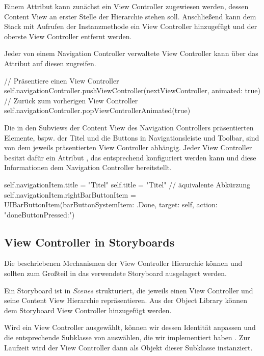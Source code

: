 \documentclass[parskip=half, final]{scrreprt}
\begin{document}
Einem Attribut  kann zunächst ein View Controller zugewiesen werden, dessen Content View an erster Stelle der Hierarchie stehen soll. Anschließend kann dem Stack mit Aufrufen der Instanzmethode  ein View Controller hinzugefügt und  der oberste View Controller entfernt werden.

Jeder von einem Navigation Controller verwaltete View Controller kann über das Attribut  auf diesen zugreifen.

\begin{swiftcode}
// Präsentiere einen View Controller
self.navigationController.pushViewController(nextViewController, animated: true)
// Zurück zum vorherigen View Controller
self.navigationController.popViewControllerAnimated(true)
\end{swiftcode}

Die in den Subviews der Content View des Navigation Controllers präsentierten Elemente, bspw. der Titel und die Buttons in Navigationsleiste und Toolbar, sind von dem jeweils präsentierten View Controller abhängig. Jeder View Controller besitzt dafür ein Attribut , das entsprechend konfiguriert werden kann und diese Informationen dem Navigation Controller bereitstellt.

\begin{swiftcode}
self.navigationItem.title = "Titel"
self.title = "Titel" // äquivalente Abkürzung
self.navigationItem.rightBarButtonItem = UIBarButtonItem(barButtonSystemItem: .Done, target: self, action: "doneButtonPressed:")
\end{swiftcode}

\subsection{View Controller in Storyboards}

Die beschriebenen Mechanismen der View Controller Hierarchie können und sollten zum Großteil in das verwendete Storyboard ausgelagert werden.

Ein Storyboard ist in \emph{Scenes} strukturiert, die jeweils einen View Controller und seine Content View Hierarchie repräsentieren. Aus der Object Library können dem Storyboard View Controller hinzugefügt werden.

Wird ein View Controller ausgewählt, können wir dessen Identität anpassen und die entsprechende Subklasse von  auswählen, die wir implementiert haben . Zur Laufzeit wird der View Controller dann als Objekt dieser Subklasse instanziert.
\end{document}

